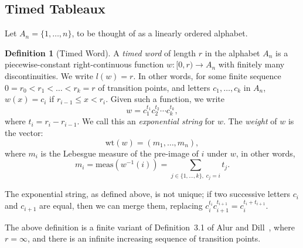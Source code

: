 \documentclass[10pt]{amsproc}
\theoremstyle{definition}
\newtheorem{definition}[theorem]{Definition}
\theoremstyle{remark}
\newcommand{\wt}{\mathrm{wt}}
\begin{document}
\subsection{Timed Tableaux}
\label{sec:timed-tableaux}
Let $A_n=\{1,\dotsc,n\}$, to be thought of as a linearly ordered alphabet.
\begin{definition}
  [Timed Word]
  \label{definition:timed-word}
  A \emph{timed word} of length $r$ in the alphabet $A_n$ is a piecewise-constant right-continuous function $w:[0,r)\to A_n$ with finitely many discontinuities.
  We write $l(w)=r$.
  In other words, for some finite sequence $0=r_0<r_1<\dotsc<r_k=r$ of transition points, and letters $c_1,\dotsc, c_k$ in $A_n$, $w(x) = c_i$ if $r_{i-1}\leq x < r_i$.
  Given such a function, we write
  \begin{equation}
    \label{eq:exp_not}
    w = c_1^{t_1} c_2^{t_2}\dotsb c_k^{t_k},
  \end{equation}
  where $t_i = r_i-r_{i-1}$.
  We call this an \emph{exponential string} for $w$.
  The \emph{weight} of $w$ is the vector:
  \begin{displaymath}
    \wt(w) = (m_1,\dotsc,m_n),
  \end{displaymath}
  where $m_i$ is the Lebesgue measure of the pre-image of $i$ under $w$, in other words,
  \begin{displaymath}
    m_i=\mathrm{meas}(w^{-1}(i)) = \sum_{j\in \{1,\dotsc,k\},\; c_j=i} t_j.
  \end{displaymath}
\end{definition}
The exponential string, as defined above, is not unique; if two successive letters $c_i$ and $c_{i+1}$ are equal, then we can merge them, replacing $c_i^{t_i}c_{i+1}^{t_{i+1}} = c_i^{t_i+t_{i+1}}$.

The above definition is a finite variant of Definition~3.1 of Alur and Dill~\cite{alur-dill}, where $r=\infty$, and there is an infinite increasing sequence of transition points.
\end{document}
